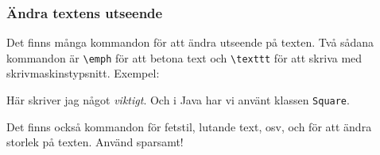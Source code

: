
\begin{frame}[fragile=singleslide]
\frametitle{Ändra textens utseende}
Det finns många kommandon för att ändra utseende på texten. Två 
sådana kommandon  är \verb+\emph+ för att betona text och \verb+\texttt+
för att skriva med skrivmaskinstypsnitt. Exempel:

\begin{exempel}
Här skriver jag något
\emph{viktigt}. Och 
i Java har vi använt
klassen \texttt{Square}.
\end{exempel}

Det finns också kommandon för fetstil, lutande text, osv, och för att
ändra storlek på texten. Använd sparsamt!
\end{frame} 

